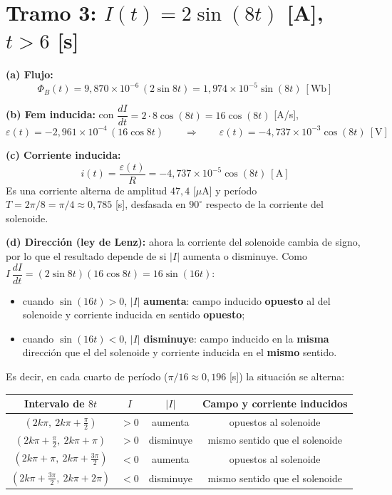 \documentclass[12pt,letterpaper]{article}
\newcommand{\eps}{\varepsilon}
\begin{document}
\section*{Tramo 3: $I(t) = 2\sin(8t)$ [A], \ $t > 6$ [s]}

\noindent\textbf{(a) Flujo:}
\[
    \boxed{\Phi_B(t) = 9{,}870\times10^{-6}\,(2\sin 8t) = 1{,}974\times10^{-5}\sin(8t)\ [\text{Wb}]}
\]

\noindent\textbf{(b) Fem inducida:} con $\dfrac{dI}{dt} = 2\cdot8\cos(8t) = 16\cos(8t)$ [A/s],
\[
    \eps(t) = -2{,}961\times10^{-4}\,(16\cos 8t)
    \qquad\Longrightarrow\qquad
    \boxed{\eps(t) = -4{,}737\times10^{-3}\cos(8t)\ [\text{V}]}
\]

\noindent\textbf{(c) Corriente inducida:}
\[
    \boxed{i(t) = \frac{\eps(t)}{R} = -4{,}737\times10^{-5}\cos(8t)\ [\text{A}]}
\]
Es una corriente alterna de amplitud $47{,}4$ [$\mu$A] y per\'iodo $T = 2\pi/8 = \pi/4\approx0{,}785$ [s],
desfasada en $90^\circ$ respecto de la corriente del solenoide.

\medskip
\noindent\textbf{(d) Direcci\'on (ley de Lenz):} ahora la corriente del solenoide cambia de signo, por
lo que el resultado depende de si $|I|$ aumenta o disminuye. Como
$I\,\dfrac{dI}{dt} = (2\sin8t)(16\cos8t) = 16\sin(16t)$:
\begin{itemize}\setlength\itemsep{2pt}
    \item cuando $\sin(16t) > 0$, $|I|$ \textbf{aumenta}: campo inducido \textbf{opuesto} al del
          solenoide y corriente inducida en sentido \textbf{opuesto};
    \item cuando $\sin(16t) < 0$, $|I|$ \textbf{disminuye}: campo inducido en la \textbf{misma}
          direcci\'on que el del solenoide y corriente inducida en el \textbf{mismo} sentido.
\end{itemize}
Es decir, en cada cuarto de per\'iodo ($\pi/16\approx0{,}196$ [s]) la situaci\'on se alterna:
\begin{center}
\renewcommand{\arraystretch}{1.35}
\begin{tabular}{|c|c|c|c|}
\hline
\textbf{Intervalo de $8t$} & $I$ & $|I|$ & \textbf{Campo y corriente inducidos} \\
\hline
$(2k\pi,\ 2k\pi+\tfrac{\pi}{2})$ & $>0$ & aumenta & opuestos al solenoide \\
$(2k\pi+\tfrac{\pi}{2},\ 2k\pi+\pi)$ & $>0$ & disminuye & mismo sentido que el solenoide \\
$(2k\pi+\pi,\ 2k\pi+\tfrac{3\pi}{2})$ & $<0$ & aumenta & opuestos al solenoide \\
$(2k\pi+\tfrac{3\pi}{2},\ 2k\pi+2\pi)$ & $<0$ & disminuye & mismo sentido que el solenoide \\
\hline
\end{tabular}
\end{center}
\end{document}
